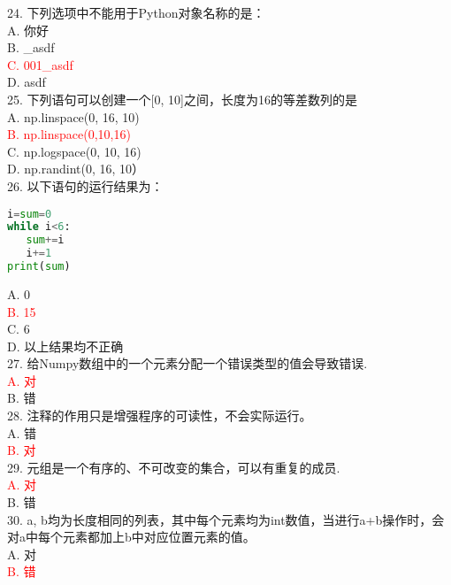 \documentclass[6pt]{article}
\begin{document}
24. 下列选项中不能用于Python对象名称的是：\\

A. 你好\\
B. \_asdf\\
\textcolor{red}{C. 001\_asdf}\\
D. asdf\\



25. 下列语句可以创建一个[0, 10]之间，长度为16的等差数列的是\\

A. np.linspace(0, 16, 10)\\
\textcolor{red}{B. np.linspace(0,10,16)}\\
C. np.logspace(0, 10, 16)\\
D. np.randint(0, 16, 10）\\

26. 以下语句的运行结果为：\\

\begin{lstlisting}[language=Python]
i=sum=0
while i<6:
   sum+=i
   i+=1
print(sum)
\end{lstlisting}
A. 0\\
\textcolor{red}{B. 15}\\
C. 6\\
D. 以上结果均不正确\\

27. 给Numpy数组中的一个元素分配一个错误类型的值会导致错误.\\

\textcolor{red}{A. 对}\\
B. 错\\

28. 注释的作用只是增强程序的可读性，不会实际运行。\\

A. 错\\
\textcolor{red}{B. 对}\\


29. 元组是一个有序的、不可改变的集合，可以有重复的成员.\\

\textcolor{red}{A. 对}\\
B. 错\\

30. a, b均为长度相同的列表，其中每个元素均为int数值，当进行a+b操作时，会对a中每个元素都加上b中对应位置元素的值。\\

A. 对\\
\textcolor{red}{B. 错}\\
\end{document}
